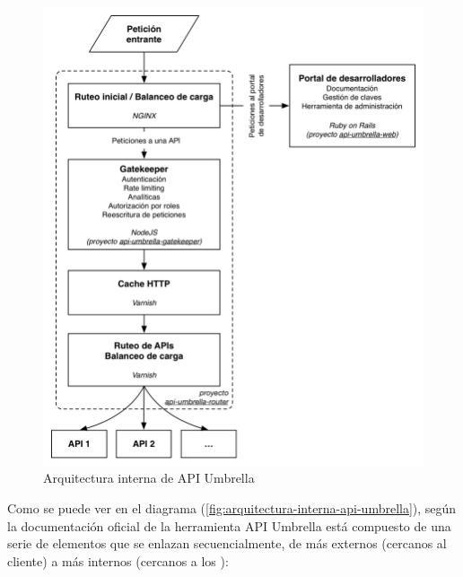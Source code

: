 \begin{figure}
  \includegraphics[width=\linewidth]{src/images/03-capitulo-3/tecnologias/api-umbrella/api-umbrella-arquitectura.png}
  \caption{Arquitectura interna de API Umbrella}
  \label{fig:arquitectura-interna-api-umbrella}
\end{figure}

Como se puede ver en el diagrama  (\autoref{fig:arquitectura-interna-api-umbrella}), según la documentación oficial de la herramienta API Umbrella está compuesto de una serie de elementos que se enlazan secuencialmente, de más externos (cercanos al cliente) a más internos (cercanos a los ):


